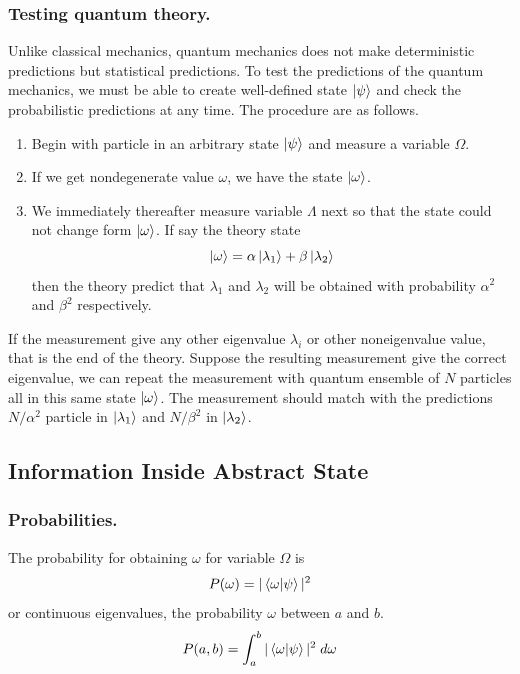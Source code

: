 \documentclass[../../../main.tex]{subfiles}
\begin{document}
\subsubsection{Testing quantum theory.}
Unlike classical mechanics, quantum mechanics does not make deterministic predictions but statistical predictions.
To test the predictions of the quantum mechanics, we must be able to create well-defined state $\ket{\psi}$ and check the probabilistic predictions at any time.
The procedure are as follows.
\begin{enumerate}
    \item Begin with particle in an arbitrary state $\ket{\psi}$ and measure a variable $\Omega$.
    \item If we get nondegenerate value $\omega$, we have the state $\ket{\omega}$.
    \item We immediately thereafter measure variable $\Lambda$ next so that the state could not change form $\ket{\omega}$.
          If say the theory state
          \begin{equation*}
              \ket{\omega}=\alpha \ket{\lambda_1}+\beta \ket{\lambda_2}
          \end{equation*}
          then the theory predict that $\lambda_1$ and $\lambda_2$ will be obtained with probability $\alpha^2$ and $\beta^2$ respectively.
\end{enumerate}
If the measurement give any other eigenvalue $\lambda_i$ or other noneigenvalue value, that is the end of the theory.
Suppose the resulting measurement give the correct eigenvalue, we can repeat the measurement with quantum ensemble of $N$ particles all in this same state $\ket{\omega}$.
The measurement should match with the predictions $N/\alpha^2$ particle in $\ket{\lambda_1}$ and $N/\beta^2$ in $\ket{\lambda_2}$.

\subsection{Information Inside Abstract State}
\subsubsection{Probabilities.}
The probability for obtaining $\omega$ for variable $\Omega$ is
\begin{equation*}
    P(\omega)=|\braket{\omega|\psi}|^2
\end{equation*}
or continuous eigenvalues, the probability $\omega$ between $a$ and $b$.
\begin{equation*}
    P(a,b)=\int_{a }^{b }|\braket{\omega|\psi}|^2\;d\omega
\end{equation*}
\end{document}
